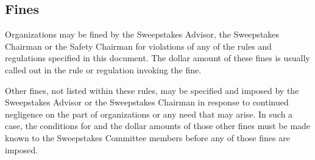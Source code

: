 \documentclass[openany]{book}
\begin{document}
\subsection{Fines}

Organizations may be fined by the Sweepstakes Advisor, the Sweepstakes Chairman or the Safety Chairman for violations of any of the rules and regulations specified in this document. The dollar amount of these fines is usually called out in the rule or regulation invoking the fine.

Other fines, not listed within these rules, may be specified and imposed by the Sweepstakes Advisor or the Sweepstakes Chairman in response to continued negligence on the part of organizations or any need that may arise. In such a case, the conditions for and the dollar amounts of those other fines must be made known to the Sweepstakes Committee members before any of those fines are imposed.
\end{document}
